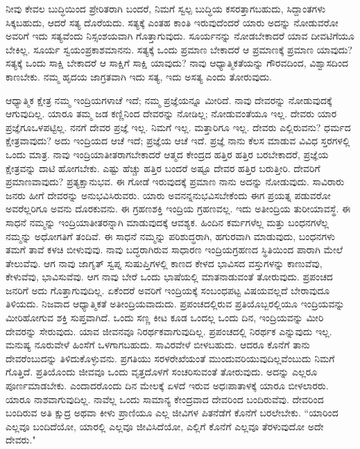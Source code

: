 ನೀವು ಕೇವಲ ಬುದ್ಧಿಯಿಂದ ಪ್ರೇರಿತರಾಗಿ ಬಂದರೆ, ನಿಮಗೆ ಸ್ವಲ್ಪ ಬುದ್ಧಿಯ ಕಸರತ್ತಾಗಬಹುದು, ಸಿದ್ದಾಂತಗಳು ಸಿಕ್ಕಬಹುದು, ಆದರೆ ಸತ್ಯ ದೊರೆಯದು. ಸತ್ಯಕ್ಕೆ ಎಂತಹ ಕಾಂತಿ ಇರುವುದೆಂದರೆ ಯಾರು ಅದನ್ನು ನೋಡುವರೋ ಅವರಿಗೆ ಇದು ಸತ್ಯವೆಂದು ನಿಸ್ಸಂಶಯವಾಗಿ ಗೊತ್ತಾಗುವುದು. ಸೂರ್ಯನನ್ನು ನೋಡಬೇಕಾದರೆ ಯಾವ ದೀವಟಿಗೆಯೂ ಬೇಕಿಲ್ಲ. ಸೂರ್ಯ ಸ್ವಯಂಪ್ರಕಾಶಮಾನನು. ಸತ್ಯಕ್ಕೆ ಒಂದು ಪ್ರಮಾಣ ಬೇಕಾದರೆ ಆ ಪ್ರಮಾಣಕ್ಕೆ ಪ್ರಮಾಣ ಯಾವುದು? ಸತ್ಯಕ್ಕೆ ಒಂದು ಸಾಕ್ಷಿ ಬೇಕಾದರೆ ಆ ಸಾಕ್ಷಿಗೆ ಸಾಕ್ಷಿ ಯಾವುದು? ನಾವು ಆಧ್ಯಾತ್ಮಿಕತೆಯನ್ನು ಗೌರವದಿಂದ, ವಿಶ್ವಾಸದಿಂದ ಕಾಣಬೇಕು. ನಮ್ಮ ಹೃದಯ ಜಾಗ್ರತವಾಗಿ ಇದು ಸತ್ಯ, ಇದು ಅಸತ್ಯ ಎಂದು ತೋರುವುದು.

ಆಧ್ಯಾತ್ಮಿಕ ಕ್ಷೇತ್ರ ನಮ್ಮ ಇಂದ್ರಿಯಗಳಾಚೆ ಇದೆ; ನಮ್ಮ ಪ್ರಜ್ಞೆಯನ್ನೂ ಮೀರಿದೆ. ನಾವು ದೇವರನ್ನು ನೋಡುವುದಕ್ಕೆ ಆಗುವುದಿಲ್ಲ. ಯಾರೂ ತಮ್ಮ ಜಡ ಕಣ್ಣಿನಿಂದ ದೇವರನ್ನು ನೋಡಿಲ್ಲ; ನೋಡುವಂತೆಯೂ ಇಲ್ಲ. ದೇವರು ಯಾರ ಪ್ರಜ್ಞೆಗೂ\break ಒಳಪಟ್ಟಿಲ್ಲ. ನನಗೆ ದೇವರ ಪ್ರಜ್ಞೆ ಇಲ್ಲ. ನಿಮಗೆ ಇಲ್ಲ. ಮತ್ತಾರಿಗೂ ಇಲ್ಲ. ದೇವರು ಎಲ್ಲಿರುವನು? ಧರ್ಮದ ಕ್ಷೇತ್ರವಾವುದು? ಅದು ಇಂದ್ರಿಯದ ಆಚೆ ಇದೆ; ಪ್ರಜ್ಞೆಯ ಆಚೆ ಇದೆ. ಪ್ರಜ್ಞೆ ನಾನು ಕೆಲಸ ಮಾಡುವ ವಿವಿಧ ಸ್ತರಗಳಲ್ಲಿ ಒಂದು ಮಾತ್ರ. ನಾವು ಇಂದ್ರಿಯಾತೀತರಾಗಬೇಕಾದರೆ ಆತ್ಮದ ಕೇಂದ್ರದ ಹತ್ತಿರ ಹತ್ತಿರ ಬರಬೇಕಾದರೆ, ಪ್ರಜ್ಞೆಯ ಕ್ಷೇತ್ರವನ್ನು ದಾಟಿ ಹೋಗಬೇಕು. ಎಷ್ಟು ಹೆಚ್ಚು ಹತ್ತಿರ ಬಂದರೆ ಅಷ್ಟೂ ದೇವರ ಹತ್ತಿರ ಬರುತ್ತೀರಿ. ದೇವರಿಗೆ ಪ್ರಮಾಣವಾವುದು? ಪ್ರತ್ಯಕ್ಷಾನುಭವ. ಈ ಗೋಡೆ ಇರುವುದಕ್ಕೆ ಪ್ರಮಾಣ ನಾನು ಅದನ್ನು ನೋಡುವುದು. ಸಾವಿರಾರು ಜನರು ಹೀಗೆ ದೇವರನ್ನು ಅನುಭವಿಸಿರುವರು. ಯಾರು ಅವನನ್ನನುಭವಿಸಬೇಕೆಂದು ಈಗ ಪ್ರಯತ್ನ ಪಡುವರೋ ಅವರೆಲ್ಲರಿಗೂ ಅವನು ದೊರಕುವನು. ಈ ಗ್ರಹಣಶಕ್ತಿ ಇಂದ್ರಿಯ ಗ್ರಹಣವಲ್ಲ. ಇದು ಅತೀಂದ್ರಿಯ ತುರೀಯಾವಸ್ಥೆ. ಈ ಸಾಧನೆ ನಮ್ಮನ್ನು ಇಂದ್ರಿಯಾತೀತರನ್ನಾಗಿ ಮಾಡುವುದಕ್ಕೆ ಆವಶ್ಯಕ. ಹಿಂದಿನ ಕರ್ಮಗಳೆಲ್ಲ ಮತ್ತು ಬಂಧನಗಳೆಲ್ಲ ನಮ್ಮನ್ನು ಅಧೋಗತಿಗೆ ತಂದಿವೆ. ಈ ಸಾಧನೆ ನಮ್ಮನ್ನು ಪರಿಶುದ್ಧರಾಗಿ, ಹಗುರವಾಗಿ ಮಾಡುವುದು, ಬಂಧನಗಳು ತಮಗೆ ತಾವೆ ಕಳಚಿ ಬೀಳುವುವು. ನಾವು ಬದ್ಧರಾಗಿರುವ ಸಾಧಾರಣ ಇಂದ್ರಿಯಗ್ರಹಣದ ಸ್ಥಿತಿಯಿಂದ ಪಾರಾಗಿ ಮೇಲೆ ತೇಲುವೆವು. ಆಗ ನಾವು ಜಾಗೃತ್ ಸ್ವಪ್ನ ಸುಷುಪ್ತಿಗಳಲ್ಲಿ ಕಾಣದ ಕೇಳದ ಭಾವಿಸದ ವಸ್ತುಗಳನ್ನು ಕಾಣುವೆವು, ಕೇಳುವೆವು, ಭಾವಿಸುವೆವು. ಆಗ ನಾವು ಬೇರೆ ಒಂದು ಭಾಷೆಯಲ್ಲಿ ಮಾತನಾಡುವಂತೆ ತೋರುವುದು. ಪ್ರಪಂಚದ ಜನರಿಗೆ ಅದು ಗೊತ್ತಾಗುವುದಿಲ್ಲ. ಏಕೆಂದರೆ ಅವರಿಗೆ ಇಂದ್ರಿಯಕ್ಕೆ ಸಂಬಂಧಪಟ್ಟ ವಿಷಯವಲ್ಲದೆ ಬೇರಾವುದೂ ತಿಳಿಯದು. ನಿಜವಾದ ಆಧ್ಯಾತ್ಮಿಕತೆ ಅತೀಂದ್ರಿಯವಾದುದು. ಪ್ರಪಂಚದಲ್ಲಿರುವ ಪ್ರತಿಯೊಬ್ಬರಲ್ಲಿಯೂ ಇಂದ್ರಿಯವನ್ನು ಮೀರಿಹೋಗುವ ಶಕ್ತಿ ಸುಪ್ತವಾಗಿದೆ. ಒಂದು ಸಣ್ಣ ಕೀಟ ಕೂಡ ಒಂದಲ್ಲ ಒಂದು ದಿನ, ಇಂದ್ರಿಯವನ್ನು ಮೀರಿ ದೇವರನ್ನು ಸೇರುವುದು. ಯಾವ ಜೀವನವೂ ನಿರರ್ಥಕವಾಗುವುದಿಲ್ಲ. ಪ್ರಪಂಚದಲ್ಲಿ ನಿರರ್ಥಕ ಎನ್ನುವುದು ಇಲ್ಲ. ಮನುಷ್ಯ ನೂರುವೇಳೆ ಹಿಂಸೆಗೆ ಒಳಗಾಗಬಹುದು. ಸಾವಿರವೇಳೆ ಬೀಳಬಹುದು. ಆದರೂ ಕೊನೆಗೆ ತಾನು ದೇವರೆಂಬುದನ್ನು ತಿಳಿದುಕೊಳ್ಳುವನು. ಪ್ರಗತಿಯು ಸರಳರೇಖೆಯಂತೆ ಮುಂದುವರಿಯುವುದಿಲ್ಲವೆಂಬುದು ನಿಮಗೆ ಗೊತ್ತಿದೆ. ಪ್ರತಿಯೊಂದು ಜೀವವೂ ಒಂದು ವೃತ್ತದೊಳಗೆ ಸಂಚರಿಸುವಂತೆ ತೋರುವುದು. ಅದನ್ನು ಎಲ್ಲರೂ ಪೂರ್ಣಮಾಡಬೇಕು. ಎಂದಾದರೊಂದು ದಿನ ಮೇಲಕ್ಕೆ ಏಳದೆ ಇರುವ ಅಧಃಪಾತಾಳಕ್ಕೆ ಯಾರೂ ಬೀಳಲಾರರು. ಯಾರೂ ನಾಶವಾಗುವುದಿಲ್ಲ. ನಾವೆಲ್ಲ ಒಂದು ಸಾಮಾನ್ಯ ಕೇಂದ್ರವಾದ ದೇವರಿಂದ ಬಂದಿರುವೆವು. ದೇವರಿಂದ ಬಂದಿರುವ ಅತಿ ಕ್ಷುದ್ರ ಅಥವಾ ಕೀಳು ಪ್ರಾಣಿಯೂ ಎಲ್ಲ ಜೀವಿಗಳ ಪಿತನೆಡೆಗೆ ಕೊನೆಗೆ ಬರಲೇಬೇಕು. “ಯಾರಿಂದ ಎಲ್ಲವೂ ಬಂದಿದೆಯೋ, ಯಾರಲ್ಲಿ ಎಲ್ಲವೂ ಜೀವಿಸಿದೆಯೋ, ಎಲ್ಲಿಗೆ ಕೊನೆಗೆ ಎಲ್ಲವೂ ತೆರಳುವುದೋ ಅದೇ ದೇವರು."

